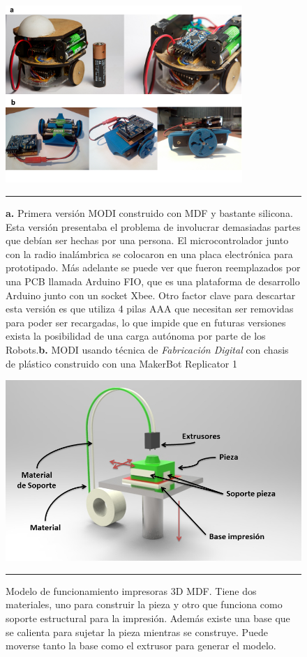 \begin{figure}[htbp]
	\centering
		\includegraphics[width=0.8\textwidth]{./Pictures/modi_analogToDigital.png}
		\rule{35em}{0.5pt}
	\caption[Comparación de construcción análoga y digital]{\textbf{a.} Primera versión MODI construido con MDF y bastante silicona. Esta versión presentaba el problema de involucrar demasiadas partes que debían ser hechas por una persona. El microcontrolador junto con la radio inalámbrica se colocaron en una placa electrónica para prototipado. Más adelante se puede ver que fueron reemplazados por una PCB llamada Arduino FIO, que es una plataforma de desarrollo Arduino junto con un socket Xbee. Otro factor clave para descartar esta versión es que utiliza 4 pilas AAA que necesitan ser removidas para poder ser recargadas, lo que impide que en futuras versiones exista la posibilidad de una carga autónoma por parte de los Robots.\textbf{b.} MODI usando técnica de \emph{ Fabricación Digital }con chasis de plástico construido con una MakerBot Replicator 1}
	\label{fig:analgTodigital}
\end{figure}

\begin{figure}[htbp]
	\centering
		\includegraphics[width=\textwidth]{./Figures/3Dprint.png}
		\rule{35em}{0.5pt}
	\caption[Modelo funcionamiento Impresora 3D]{Modelo de funcionamiento impresoras 3D MDF. Tiene dos materiales, uno para construir la pieza y otro que funciona como soporte estructural para la impresión. Además existe una base que se calienta para sujetar la pieza mientras se construye. Puede moverse tanto la base como el extrusor para generar el modelo.}
	\label{fig:3Dprint}
\end{figure}	



